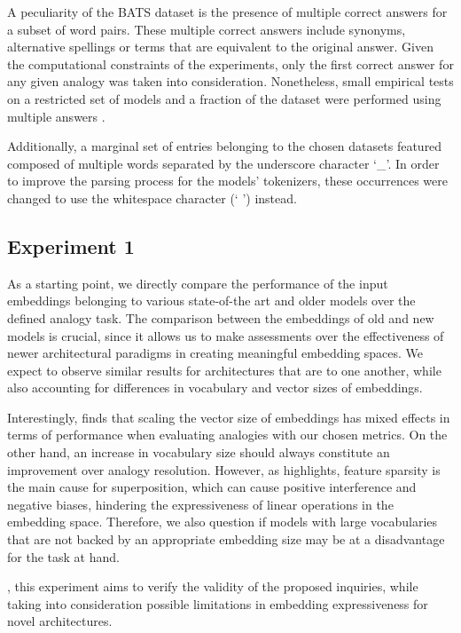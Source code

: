 A peculiarity of the BATS dataset is the presence of multiple correct answers for a subset of word pairs.
These multiple correct answers include synonyms, alternative spellings or terms that are equivalent to the original answer.
Given the computational constraints of the experiments, only the first correct answer for any given analogy was taken into consideration.
Nonetheless, small empirical tests on a restricted set of models and a fraction of the dataset were performed using multiple answers . 

Additionally, a marginal set of entries belonging to the chosen datasets featured  composed of multiple words separated by the underscore character `\_'.
In order to improve the parsing process for the models' tokenizers, these occurrences were changed to use the whitespace character (` ') instead.

\subsection{Experiment 1}\label{ssec:exp_emb_exp1}

As a starting point, we directly compare the performance of the input embeddings belonging to various state-of-the art and older models over the defined analogy task.
The comparison between the embeddings of old and new models is crucial, since it allows us to make assessments over the effectiveness of newer architectural paradigms in creating meaningful embedding spaces.
We expect to observe similar results for architectures that are  to one another, while also accounting for differences in vocabulary and vector sizes of embeddings.

Interestingly, \citet{drozd2016} finds that scaling the vector size of embeddings has mixed effects in terms of performance when evaluating analogies with our chosen metrics.
On the other hand, an increase in vocabulary size should always constitute an improvement over analogy resolution.
However, as \citet{elhage2022} highlights, feature sparsity is the main cause for superposition, which can cause positive interference and negative biases, hindering the expressiveness of linear operations in the embedding space.
Therefore, we also question if models with large vocabularies that are not backed by an appropriate embedding size may be at a disadvantage for the task at hand.

, this experiment aims to verify the validity of the proposed inquiries, while taking into consideration possible limitations in embedding expressiveness for novel architectures.

